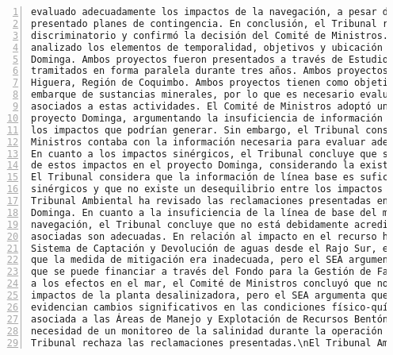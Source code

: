 \begin{Verbatim}[frame=lines, label=Elavoración propia -  Ejemplo de Contexto enviado por el Chatbot a OpenAI
				, fontsize=\scriptsize, numbers=left
				, baselinestretch=0.4
				, formatcom=\color{gray}]
evaluado adecuadamente los impactos de la navegación, a pesar de haber identificado riesgos y
presentado planes de contingencia. En conclusión, el Tribunal rechazó la alegación de trato
discriminatorio y confirmó la decisión del Comité de Ministros.\nEl Tribunal Ambiental ha
analizado los elementos de temporalidad, objetivos y ubicación de los proyectos Cruz Grande y
Dominga. Ambos proyectos fueron presentados a través de Estudios de Impacto Ambiental y fueron
tramitados en forma paralela durante tres años. Ambos proyectos se ubican en la comuna de La
Higuera, Región de Coquimbo. Ambos proyectos tienen como objetivo la recepción, acopio y
embarque de sustancias minerales, por lo que es necesario evaluar los impactos ambientales
asociados a estas actividades. El Comité de Ministros adoptó un actuar distinto respecto al
proyecto Dominga, argumentando la insuficiencia de información sobre las rutas de navegación y
los impactos que podrían generar. Sin embargo, el Tribunal considera que el Comité de
Ministros contaba con la información necesaria para evaluar adecuadamente el proyecto Dominga.
En cuanto a los impactos sinérgicos, el Tribunal concluye que se realizó un análisis completo
de estos impactos en el proyecto Dominga, considerando la existencia del proyecto Cruz Grande.
El Tribunal considera que la información de línea base es suficiente para definir los impactos
sinérgicos y que no existe un desequilibrio entre los impactos y las medidas propuestas.\nEl
Tribunal Ambiental ha revisado las reclamaciones presentadas en relación al proyecto minero
Dominga. En cuanto a la insuficiencia de la línea de base del medio marino en las rutas de
navegación, el Tribunal concluye que no está debidamente acreditada y que las medidas
asociadas son adecuadas. En relación al impacto en el recurso hídrico por el cierre del
Sistema de Captación y Devolución de aguas desde el Rajo Sur, el Comité de Ministros consideró
que la medida de mitigación era inadecuada, pero el SEA argumenta que la medida es idónea y
que se puede financiar a través del Fondo para la Gestión de Faenas Mineras Cerradas. Respecto
a los efectos en el mar, el Comité de Ministros concluyó que no se evaluaron adecuadamente los
impactos de la planta desalinizadora, pero el SEA argumenta que sí se evaluaron y que no se
evidencian cambios significativos en las condiciones físico-químicas ni en la biodiversidad
asociada a las Áreas de Manejo y Explotación de Recursos Bentónicos. Además, se establece la
necesidad de un monitoreo de la salinidad durante la operación del proyecto. En conclusión, el
Tribunal rechaza las reclamaciones presentadas.\nEl Tribunal Ambiental concluye que las

\end{Verbatim}
